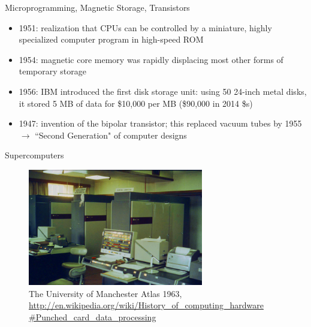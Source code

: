 \documentclass[xcolor=x11names,compress]{beamer}
\renewcommand{\(}{\begin{columns}}
\renewcommand{\)}{\end{columns}}
\newcommand{\<}[1]{\begin{column}{#1}}
\renewcommand{\>}{\end{column}}
\begin{document}
\begin{frame}{Microprogramming, Magnetic Storage, Transistors}
\begin{itemize}
\item 1951: realization that CPUs can be controlled by a miniature, highly specialized computer program in high-speed ROM \vspace*{0.5 em}
\item 1954: magnetic core memory was rapidly displacing most other forms of temporary storage \vspace*{0.5 em}
\item 1956: IBM introduced the first disk storage unit: using 50 24-inch metal disks, it stored 5 MB of data for \$10,000 per MB (\$90,000 in 2014 \$s)\vspace*{0.5 em}
\item 1947: invention of the bipolar transistor; this replaced vacuum tubes by 1955 $\rightarrow$ ``Second Generation" of computer designs
\end{itemize}
\end{frame}

\begin{frame}{Supercomputers}

\begin{figure}
\includegraphics[height=2in,clip]{Atlas1963}
\caption{The University of Manchester Atlas 1963, \href{http://en.wikipedia.org/wiki/History_of_computing_hardware
\#Punched_card_data_processing}{http://en.wikipedia.org/wiki/History\_of\_computing\_hardware
\#Punched\_card\_data\_processing}}
\end{figure}

\end{frame}
\end{document}
